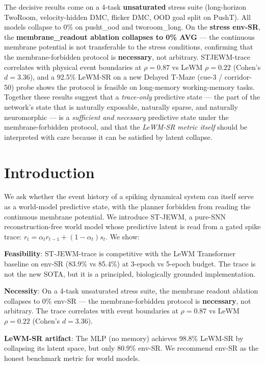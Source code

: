 \documentclass{article}
\begin{document}
The decisive results come on a 4-task \textbf{unsaturated} stress suite (long-horizon
TwoRoom, velocity-hidden DMC, flicker DMC, OOD goal split on PushT). All
models collapse to 0\% on pusht\_ood and tworoom\_long. On the \textbf{stress env-SR},
the \textbf{membrane\_readout ablation collapses to 0\% AVG} — the continuous
membrane potential is not transferable to the stress conditions,
confirming that the membrane-forbidden protocol is \textbf{necessary}, not
arbitrary. STJEWM-trace correlates with physical event boundaries at $\rho=0.87$
vs LeWM $\rho=0.22$ (Cohen's $d=3.36$), and a 92.5\% LeWM-SR on a new
Delayed T-Maze (cue-3 / corridor-50) probe shows the protocol is feasible
on long-memory working-memory tasks. Together these results suggest that
a \emph{trace-only} predictive state — the part of the network's state that
is naturally exposable, naturally sparse, and naturally neuromorphic — is
a \emph{sufficient and necessary} predictive state under the membrane-forbidden
protocol, and that the \emph{LeWM-SR metric itself} should be interpreted with
care because it can be satisfied by latent collapse.

\section{Introduction}

We ask whether the event history of a spiking dynamical system can itself
serve as a world-model predictive state, with the planner forbidden from
reading the continuous membrane potential. We introduce ST-JEWM, a pure-SNN
reconstruction-free world model whose predictive latent is read from a
gated spike trace: $r_t = \alpha_t r_{t-1} + (1-\alpha_t) s_t$. We show:

\textbf{Feasibility}: ST-JEWM-trace is competitive with the LeWM Transformer
baseline on env-SR (83.9\% vs 85.4\%) at 3-epoch vs 5-epoch budget. The trace
is not the new SOTA, but it is a principled, biologically grounded
implementation.

\textbf{Necessity}: On a 4-task unsaturated stress suite, the membrane readout
ablation collapses to 0\% env-SR — the membrane-forbidden protocol is
\textbf{necessary}, not arbitrary. The trace correlates with event boundaries
at $\rho=0.87$ vs LeWM $\rho=0.22$ (Cohen's $d=3.36$).

\textbf{LeWM-SR artifact}: The MLP (no memory) achieves 98.8\% LeWM-SR by
collapsing its latent space, but only 80.9\% env-SR. We recommend env-SR
as the honest benchmark metric for world models.
\end{document}
